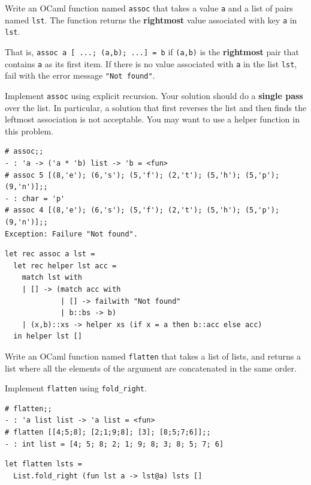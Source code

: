 \documentclass[addpoints]{exam}
\begin{document}
\begin{questions}
  
  \question
  Write an OCaml function named \texttt{assoc} that takes a value \texttt{a} and
  a list of pairs named \texttt{lst}.
  The function returns the \textbf{rightmost} value associated with key \texttt{a}
  in \texttt{lst}.

  That is, \texttt{assoc a [ ...; (a,b); ...] = b} if \texttt{(a,b)} is the \textbf{rightmost}
  pair that contains \texttt{a} as its first item.
  If there is no value associated with \texttt{a} in the list \texttt{lst},
  fail with the error message \texttt{"Not found"}.

  Implement \texttt{assoc} using explicit recursion.
  Your solution should do a \textbf{single pass} over the list.
  In particular, a solution that first reverses the list
  and then finds the leftmost association is not acceptable.
  You may want to use a helper function in this problem.
  
  \begin{verbatim}
# assoc;;
- : 'a -> ('a * 'b) list -> 'b = <fun>
# assoc 5 [(8,'e'); (6,'s'); (5,'f'); (2,'t'); (5,'h'); (5,'p'); (9,'n')];;
- : char = 'p'
# assoc 4 [(8,'e'); (6,'s'); (5,'f'); (2,'t'); (5,'h'); (5,'p'); (9,'n')];;
Exception: Failure "Not found".
  \end{verbatim}

  \begin{solutionbox}{5cm}
    \begin{verbatim}
let rec assoc a lst =
  let rec helper lst acc =
    match lst with
    | [] -> (match acc with
             | [] -> failwith "Not found"
             | b::bs -> b)
    | (x,b)::xs -> helper xs (if x = a then b::acc else acc)
  in helper lst []
    \end{verbatim}
  \end{solutionbox}

  
  \question
  Write an OCaml function named \texttt{flatten} that takes a list of lists,
  and returns a list where all the elements of the argument
  are concatenated in the same order.

  Implement \texttt{flatten} using \texttt{fold\_right}. 

  \begin{verbatim}
# flatten;; 
- : 'a list list -> 'a list = <fun>
# flatten [[4;5;8]; [2;1;9;8]; [3]; [8;5;7;6]];;
- : int list = [4; 5; 8; 2; 1; 9; 8; 3; 8; 5; 7; 6]
  \end{verbatim}

  \begin{solutionbox}{2cm}
    \begin{verbatim}
let flatten lsts =
  List.fold_right (fun lst a -> lst@a) lsts []
    \end{verbatim}
  \end{solutionbox}


\end{questions}
\end{document}
